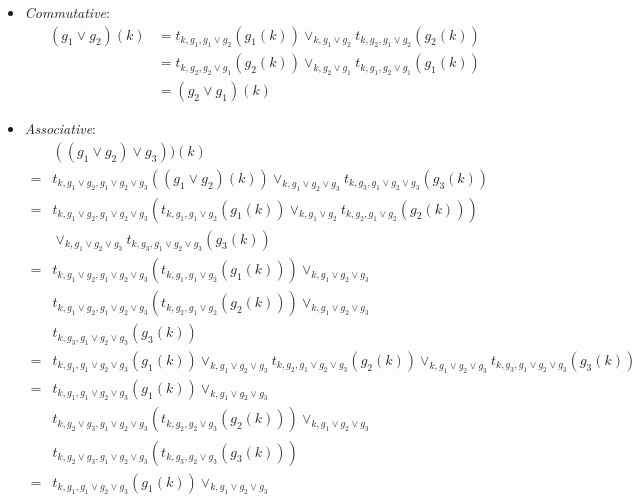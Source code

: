 \documentclass{article}
\begin{document}
        \begin{itemize}
          \item \emph{Commutative}:
            \begin{align*}
              (g_1 \vee g_2)(k) &= t_{k, g_1, g_1 \vee g_2}(g_1(k)) \vee_{k, g_1 \vee g_2} t_{k, g_2, g_1 \vee g_2}(g_2(k)) \\
              &= t_{k, g_2, g_2 \vee g_1}(g_2(k)) \vee_{k, g_2 \vee g_1} t_{k, g_1, g_2 \vee g_1}(g_1(k)) \\
              &= (g_2 \vee g_1)(k)
            \end{align*}
          \item \emph{Associative}:
            \begin{align*}
              &((g_1 \vee g_2) \vee g_3))(k) \\
              =& t_{k, g_1 \vee g_2, g_1 \vee g_2 \vee g_3}((g_1 \vee g_2)(k)) \vee_{k, g_1 \vee g_2 \vee g_3} t_{k, g_3, g_1 \vee g_2 \vee g_3}(g_3(k)) \\
              =& t_{k, g_1 \vee g_2, g_1 \vee g_2 \vee g_3}\left(t_{k, g_1, g_1 \vee g_2}(g_1(k)) \vee_{k, g_1 \vee g_2} t_{k, g_2, g_1 \vee g_2}(g_2(k))\right) \\
               & \vee_{k, g_1 \vee g_2 \vee g_3} t_{k, g_3, g_1 \vee g_2 \vee g_3}(g_3(k)) \\
              =& t_{k, g_1 \vee g_2, g_1 \vee g_2 \vee g_3}(t_{k, g_1, g_1 \vee g_2}(g_1(k))) \vee_{k, g_1 \vee g_2 \vee g_3} \\
               & t_{k, g_1 \vee g_2, g_1 \vee g_2 \vee g_3}(t_{k, g_2, g_1 \vee g_2}(g_2(k))) \vee_{k, g_1 \vee g_2 \vee g_3} \\
               & t_{k, g_3, g_1 \vee g_2 \vee g_3}(g_3(k)) \\
              =& t_{k, g_1, g_1 \vee g_2 \vee g_3}(g_1(k)) \vee_{k, g_1 \vee g_2 \vee g_3}
                 t_{k, g_2, g_1 \vee g_2 \vee g_3}(g_2(k)) \vee_{k, g_1 \vee g_2 \vee g_3}
                 t_{k, g_3, g_1 \vee g_2 \vee g_3}(g_3(k)) \\
              =& t_{k, g_1, g_1 \vee g_2 \vee g_3}(g_1(k)) \vee_{k, g_1 \vee g_2 \vee g_3} \\
               & t_{k, g_2 \vee g_3, g_1 \vee g_2 \vee g_3}(t_{k, g_2, g_2 \vee g_3}(g_2(k))) \vee_{k, g_1 \vee g_2 \vee g_3} \\
               & t_{k, g_2 \vee g_3, g_1 \vee g_2 \vee g_3}(t_{k, g_3, g_2 \vee g_3}(g_3(k))) \\
              =& t_{k, g_1, g_1 \vee g_2 \vee g_3}(g_1(k)) \vee_{k, g_1 \vee g_2 \vee g_3} \\

\end{align*}
\end{itemize}
\end{document}

